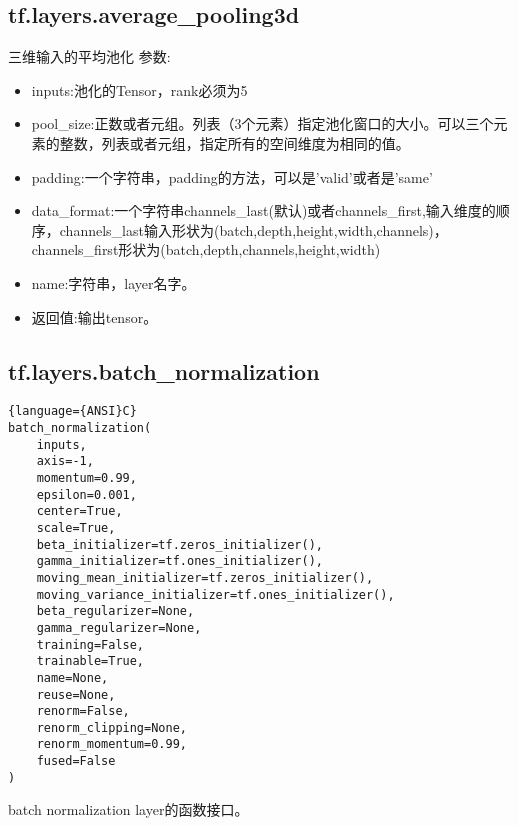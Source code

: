 \subsection{tf.layers.average\_pooling3d}
三维输入的平均池化
参数:
\begin{itemize}
	\item inputs:池化的Tensor，rank必须为5
	\item pool\_size:正数或者元组。列表（3个元素）指定池化窗口的大小。可以三个元素的整数，列表或者元组，指定所有的空间维度为相同的值。
	\item padding:一个字符串，padding的方法，可以是'valid'或者是'same'
	\item data\_format:一个字符串channels\_last(默认)或者channels\_first,输入维度的顺序，channels\_last输入形状为(batch,depth,height,width,channels)，channels\_first形状为(batch,depth,channels,height,width)
	\item name:字符串，layer名字。
	\item 返回值:输出tensor。
\end{itemize}
\subsection{tf.layers.batch_normalization}
\begin{lstlisting}{language={ANSI}C}
batch_normalization(
    inputs,
    axis=-1,
    momentum=0.99,
    epsilon=0.001,
    center=True,
    scale=True,
    beta_initializer=tf.zeros_initializer(),
    gamma_initializer=tf.ones_initializer(),
    moving_mean_initializer=tf.zeros_initializer(),
    moving_variance_initializer=tf.ones_initializer(),
    beta_regularizer=None,
    gamma_regularizer=None,
    training=False,
    trainable=True,
    name=None,
    reuse=None,
    renorm=False,
    renorm_clipping=None,
    renorm_momentum=0.99,
    fused=False
)
\end{lstlisting}
batch normalization layer的函数接口。
